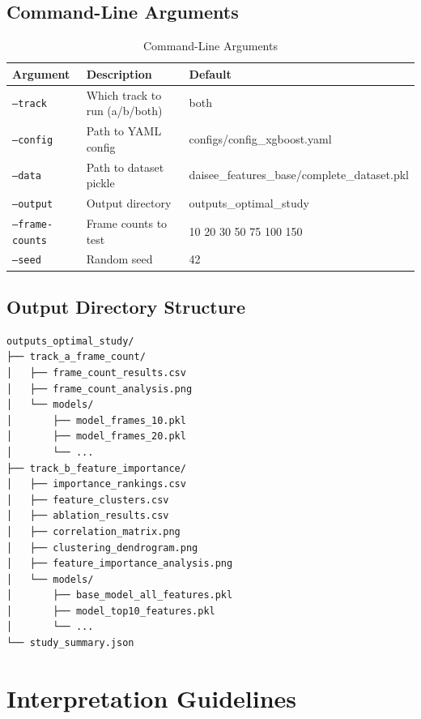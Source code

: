 \documentclass[11pt,a4paper]{article}
\begin{document}
\subsection{Command-Line Arguments}

\begin{table}[H]
  \centering
  \caption{Command-Line Arguments}
  \label{tab:cli-args}
  \begin{tabular}{@{}lll@{}}
    \toprule
    \textbf{Argument} & \textbf{Description} & \textbf{Default} \\
    \midrule
    \texttt{--track} & Which track to run (a/b/both) & both \\
    \texttt{--config} & Path to YAML config & configs/config\_xgboost.yaml \\
    \texttt{--data} & Path to dataset pickle & daisee\_features\_base/complete\_dataset.pkl \\
    \texttt{--output} & Output directory & outputs\_optimal\_study \\
    \texttt{--frame-counts} & Frame counts to test & 10 20 30 50 75 100 150 \\
    \texttt{--seed} & Random seed & 42 \\
    \bottomrule
  \end{tabular}
\end{table}

\subsection{Output Directory Structure}

\begin{verbatim}
outputs_optimal_study/
├── track_a_frame_count/
│   ├── frame_count_results.csv
│   ├── frame_count_analysis.png
│   └── models/
│       ├── model_frames_10.pkl
│       ├── model_frames_20.pkl
│       └── ...
├── track_b_feature_importance/
│   ├── importance_rankings.csv
│   ├── feature_clusters.csv
│   ├── ablation_results.csv
│   ├── correlation_matrix.png
│   ├── clustering_dendrogram.png
│   ├── feature_importance_analysis.png
│   └── models/
│       ├── base_model_all_features.pkl
│       ├── model_top10_features.pkl
│       └── ...
└── study_summary.json
\end{verbatim}

\section{Interpretation Guidelines}\label{sec:interpretation}
\end{document}
